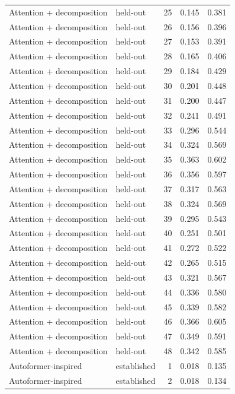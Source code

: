\begin{tabular}{llrrr}
Attention + decomposition & held-out & 25 & 0.145 & 0.381 \\
Attention + decomposition & held-out & 26 & 0.156 & 0.396 \\
Attention + decomposition & held-out & 27 & 0.153 & 0.391 \\
Attention + decomposition & held-out & 28 & 0.165 & 0.406 \\
Attention + decomposition & held-out & 29 & 0.184 & 0.429 \\
Attention + decomposition & held-out & 30 & 0.201 & 0.448 \\
Attention + decomposition & held-out & 31 & 0.200 & 0.447 \\
Attention + decomposition & held-out & 32 & 0.241 & 0.491 \\
Attention + decomposition & held-out & 33 & 0.296 & 0.544 \\
Attention + decomposition & held-out & 34 & 0.324 & 0.569 \\
Attention + decomposition & held-out & 35 & 0.363 & 0.602 \\
Attention + decomposition & held-out & 36 & 0.356 & 0.597 \\
Attention + decomposition & held-out & 37 & 0.317 & 0.563 \\
Attention + decomposition & held-out & 38 & 0.324 & 0.569 \\
Attention + decomposition & held-out & 39 & 0.295 & 0.543 \\
Attention + decomposition & held-out & 40 & 0.251 & 0.501 \\
Attention + decomposition & held-out & 41 & 0.272 & 0.522 \\
Attention + decomposition & held-out & 42 & 0.265 & 0.515 \\
Attention + decomposition & held-out & 43 & 0.321 & 0.567 \\
Attention + decomposition & held-out & 44 & 0.336 & 0.580 \\
Attention + decomposition & held-out & 45 & 0.339 & 0.582 \\
Attention + decomposition & held-out & 46 & 0.366 & 0.605 \\
Attention + decomposition & held-out & 47 & 0.349 & 0.591 \\
Attention + decomposition & held-out & 48 & 0.342 & 0.585 \\
Autoformer-inspired & established & 1 & 0.018 & 0.135 \\
Autoformer-inspired & established & 2 & 0.018 & 0.134 \\

\end{tabular}
